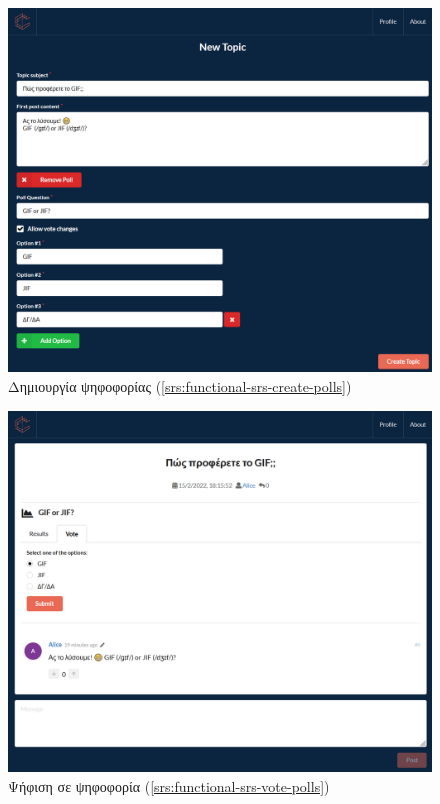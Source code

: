 \begin{figure}[H]
	\centering
	\includegraphics[width=\textwidth]{assets/figures/appendix-a/screenshot-6-poll-creation}
	\caption{Δημιουργία ψηφοφορίας (\ref{srs:functional-srs-create-polls})}
\end{figure}

\begin{figure}[H]
	\centering
	\includegraphics[width=\textwidth]{assets/figures/appendix-a/screenshot-7-poll-voting}
	\caption{Ψήφιση σε ψηφοφορία (\ref{srs:functional-srs-vote-polls})}
\end{figure}


